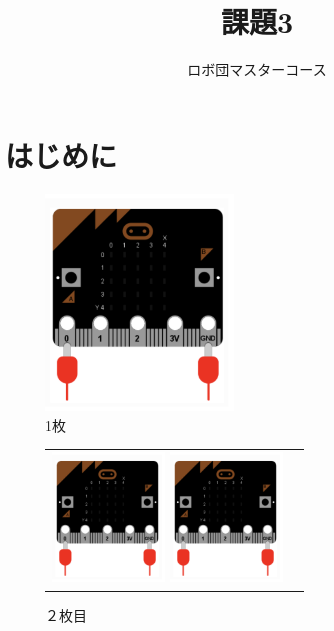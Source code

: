 \documentclass[dvipdfmx]{jsarticle}
\begin{document}
\title{課題3}
\author{ロボ団マスターコース}
\maketitle

\section{はじめに}
\begin{figure}[H]
  \centering
  \includegraphics[width=5cm]{1.png}
  \caption{1枚}
\end{figure}

\begin{figure}[H]
  \begin{tabular}{cc}
  \begin{minipage}{.5\textwidth}
      \centering
      \includegraphics[width=3cm]{1.png}
      \caption{１枚目}
      \label{fig:c}
  \end{minipage}
      \begin{minipage}{.5\textwidth}
      \centering
      \includegraphics[width=3cm]{1.png}
      \caption{２枚目}
      \label{fig:d}
  \end{minipage}
  \end{tabular}
\end{figure}
\end{document}
